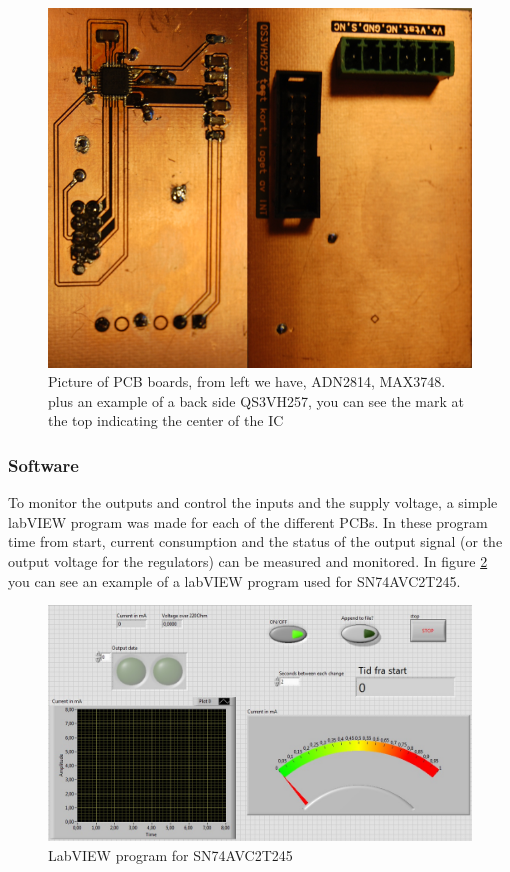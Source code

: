 \documentclass[12pt]{article}
\numberwithin{figure}{section}
\begin{document}
\begin{figure}[!htbp]
  \centering
  \includegraphics[width=\textwidth]{PCB_board3.png}
  \caption{Picture of PCB boards, from left we have, ADN2814, MAX3748. plus an example of a back side QS3VH257, you can see the mark at the top indicating the center of the \ac{IC}}
  \label{PCB_board3}
\end{figure}


\subsubsection{Software}
To monitor the outputs and control the inputs and the supply voltage, a simple labVIEW program was made for each of the different \ac{PCB}s.
In these program time from start, current consumption and the status of the output signal (or the output voltage for the regulators) can be measured and monitored.
In figure \ref{labVIEW} you can see an example of a labVIEW program used for SN74AVC2T245.

\begin{figure}[!htbp]
  \centering
  \includegraphics[width=\textwidth]{labVIEW.jpg}
  \caption{LabVIEW program for SN74AVC2T245}
  \label{labVIEW}
\end{figure}
\end{document}
